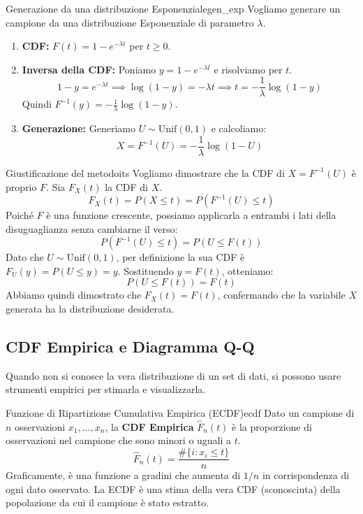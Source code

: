 \begin{esempio}{Generazione da una distribuzione Esponenziale}{gen_exp}
Vogliamo generare un campione da una distribuzione Esponenziale di parametro \( \lambda \).
\begin{enumerate}
    \item \textbf{CDF:} \( F(t) = 1 - e^{-\lambda t} \) per \( t \ge 0 \).
    \item \textbf{Inversa della CDF:} Poniamo \( y = 1 - e^{-\lambda t} \) e risolviamo per \( t \).
    \[
    1-y = e^{-\lambda t} \implies \log(1-y) = -\lambda t \implies t = -\frac{1}{\lambda}\log(1-y)
    \]
    Quindi \( F^{-1}(y) = -\frac{1}{\lambda}\log(1-y) \).
    \item \textbf{Generazione:} Generiamo \( U \sim \text{Unif}(0,1) \) e calcoliamo:
    \[
    X = F^{-1}(U) = -\frac{1}{\lambda}\log(1-U)
    \]
\end{enumerate}
\end{esempio}

\begin{dimostrazione}{Giustificazione del metodo}{its}
Vogliamo dimostrare che la CDF di \( X = F^{-1}(U) \) è proprio \( F \). Sia \( F_X(t) \) la CDF di \( X \).
\[
F_X(t) = P(X \le t) = P(F^{-1}(U) \le t)
\]
Poiché \( F \) è una funzione crescente, possiamo applicarla a entrambi i lati della disuguaglianza senza cambiarne il verso:
\[
P(F^{-1}(U) \le t) = P(U \le F(t))
\]
Dato che \( U \sim \text{Unif}(0,1) \), per definizione la sua CDF è \( F_U(y) = P(U \le y) = y \). Sostituendo \( y = F(t) \), otteniamo:
\[
P(U \le F(t)) = F(t)
\]
Abbiamo quindi dimostrato che \( F_X(t) = F(t) \), confermando che la variabile \( X \) generata ha la distribuzione desiderata.
\end{dimostrazione}

\subsection{CDF Empirica e Diagramma Q-Q}\label{ssec:ecdf_qq}
Quando non si conosce la vera distribuzione di un set di dati, si possono usare strumenti empirici per stimarla e visualizzarla.

\begin{definizione}{Funzione di Ripartizione Cumulativa Empirica (ECDF)}{ecdf}
Dato un campione di \( n \) osservazioni \( x_1, \dots, x_n \), la \textbf{CDF Empirica} \( \hat{F}_n(t) \) è la proporzione di osservazioni nel campione che sono minori o uguali a \( t \).
\[
\hat{F}_n(t) = \frac{\#\{i: x_i \le t\}}{n}
\]
Graficamente, è una funzione a gradini che aumenta di \( 1/n \) in corrispondenza di ogni dato osservato. La ECDF è una stima della vera CDF (sconosciuta) della popolazione da cui il campione è stato estratto.
\end{definizione}

